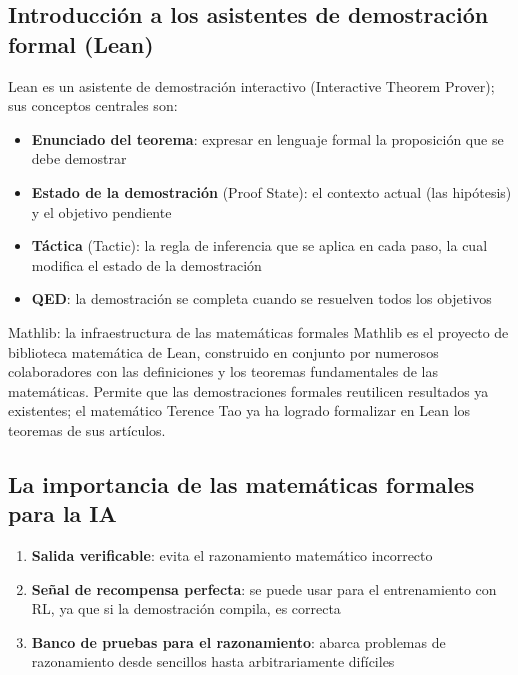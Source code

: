 \documentclass[a4paper]{article}
\begin{document}
\subsection{Introducción a los asistentes de demostración formal (Lean)}

Lean es un asistente de demostración interactivo (Interactive Theorem Prover); sus conceptos centrales son:
\begin{itemize}
    \item \textbf{Enunciado del teorema}: expresar en lenguaje formal la proposición que se debe demostrar
    \item \textbf{Estado de la demostración} (Proof State): el contexto actual (las hipótesis) y el objetivo pendiente
    \item \textbf{Táctica} (Tactic): la regla de inferencia que se aplica en cada paso, la cual modifica el estado de la demostración
    \item \textbf{QED}: la demostración se completa cuando se resuelven todos los objetivos
\end{itemize}

\begin{knowledgebox}{Mathlib: la infraestructura de las matemáticas formales}
Mathlib es el proyecto de biblioteca matemática de Lean, construido en conjunto por numerosos colaboradores con las definiciones y los teoremas fundamentales de las matemáticas. Permite que las demostraciones formales reutilicen resultados ya existentes; el matemático Terence Tao ya ha logrado formalizar en Lean los teoremas de sus artículos.
\end{knowledgebox}

\subsection{La importancia de las matemáticas formales para la IA}

\begin{enumerate}
    \item \textbf{Salida verificable}: evita el razonamiento matemático incorrecto
    \item \textbf{Señal de recompensa perfecta}: se puede usar para el entrenamiento con RL, ya que si la demostración compila, es correcta
    \item \textbf{Banco de pruebas para el razonamiento}: abarca problemas de razonamiento desde sencillos hasta arbitrariamente difíciles
\end{enumerate}
\end{document}
